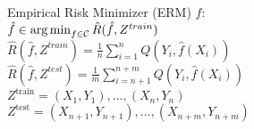 Empirical Risk Minimizer (ERM) $\hat{f}$:\\
$\hat{f} \in \operatorname*{arg\,min}_{f \in \mathcal{C}} \hat{R}(\hat{f}, Z^{train})$\\
$\hat{R}(\hat{f}, Z^{train}) = \frac{1}{n} \sum_{i=1}^n Q(Y_i, \hat{f}(X_i))$\\
$\hat{R}(\hat{f}, Z^{test}) = \frac{1}{m} \sum_{i=n+1}^{n+m} Q(Y_i, \hat{f}(X_i))$\\
$Z^\text{train}={(X_1,Y_1),...,(X_n,Y_n)}$ \\
$Z^\text{test}={(X_{n+1},Y_{n+1}),...,(X_{n+m},Y_{n+m})}$

